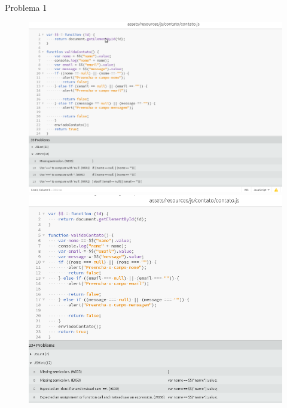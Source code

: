 Problema 1
\begin{figure}[!htb]
\setcounter{figure}{0}
\centering
\begin{minipage}{.5\textwidth}
  \centering
  \includegraphics[width=.9\linewidth]{./img/hint1.png}
\end{minipage}%
\begin{minipage}{.5\textwidth}
  \centering
  \includegraphics[width=.7\linewidth]{./img/hint1-arrumado.png}
\end{minipage}
\end{figure}	


